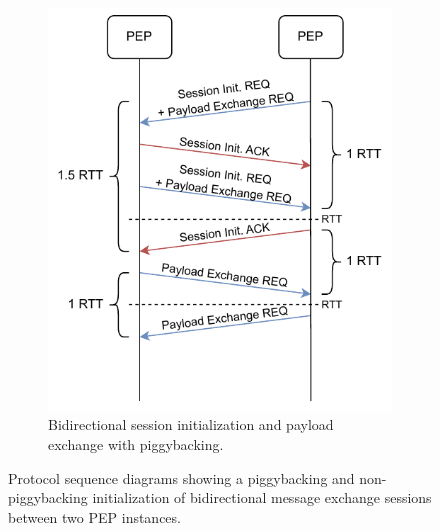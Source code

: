 \begin{description}
\begin{figure}
\begin{subfigure}[t]{0.48\linewidth}
            \includegraphics[width=\linewidth]{figures/SABAAC_protocols_accesscontrol_initialization_rtt_piggyback.drawio.pdf}
            \caption{Bidirectional session initialization and payload exchange with piggybacking.}
            \label{fig:sabaac_accesscontrol_initialization_rtt_piggyback}
        \end{subfigure}
        \caption{Protocol sequence diagrams showing a piggybacking and non-piggybacking initialization of bidirectional message exchange sessions between two PEP instances.
        }
        \label{fig:sabaac_accesscontrol_initialization_rtt}
    \end{figure}
\end{description}


